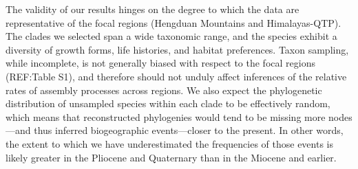 The validity of our results hinges on the degree to which the data are representative of the focal regions (Hengduan Mountains and Himalayas-QTP). The clades we selected span a wide taxonomic range, and the species exhibit a diversity of growth forms, life histories, and habitat preferences. Taxon sampling, while incomplete, is not generally biased with respect to the focal regions (REF:Table S1), and therefore should not unduly affect inferences of the relative rates of assembly processes across regions. We also expect the phylogenetic distribution of unsampled species within each clade to be effectively random, which means that reconstructed phylogenies would tend to be missing more nodes---and thus inferred biogeographic events---closer to the present. In other words, the extent to which we have underestimated the frequencies of those events is likely greater in the Pliocene and Quaternary than in the Miocene and earlier.










